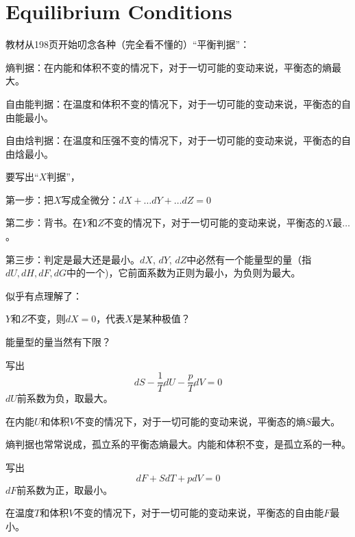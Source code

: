 \documentclass[CJK]{beamer}
\begin{document}
\section{Equilibrium Conditions}


\begin{frame}
\bch
教材从198页开始叨念各种（完全看不懂的）“平衡判据”：

\bitem
\item{熵判据：在内能和体积不变的情况下，对于一切可能的变动来说，平衡态的熵最大。}
\item{自由能判据：在温度和体积不变的情况下，对于一切可能的变动来说，平衡态的自由能最小。}
\item{自由焓判据：在温度和压强不变的情况下，对于一切可能的变动来说，平衡态的自由焓最小。}
\eitem

\ech
\end{frame}

\begin{frame}
\bch
{}

要写出“$X$判据”，

\bitem
\item{第一步：把$X$写成全微分：$dX + \ldots dY + \ldots dZ = 0$}
\item{第二步：背书。在$Y$和$Z$不变的情况下，对于一切可能的变动来说，平衡态的$X$最$\ldots$。}
\item{第三步：判定是最大还是最小。$dX$, $dY$, $dZ$中必然有一个能量型的量（指$dU, dH, dF, dG$中的一个)，它前面系数为正则为最小，为负则为最大。}
\eitem

{\scriptsize
似乎有点理解了：

$Y$和$Z$不变，则$dX = 0$，代表$X$是某种极值？

能量型的量当然有下限？
}
\ech
\end{frame}


\begin{frame}
\bch
写出
$$dS - \frac{1}{T} dU - \frac{p}{T} dV = 0 $$
$dU$前系数为负，取最大。

在内能$U$和体积$V$不变的情况下，对于一切可能的变动来说，平衡态的熵$S$最大。

\skiplines

熵判据也常常说成，孤立系的平衡态熵最大。内能和体积不变，是孤立系的一种。
\ech
\end{frame}


\begin{frame}
\bch
写出
$$dF  + S dT + p dV = 0 $$
$dF$前系数为正，取最小。


在温度$T$和体积$V$不变的情况下，对于一切可能的变动来说，平衡态的自由能$F$最小。

\ech
\end{frame}
\end{document}
